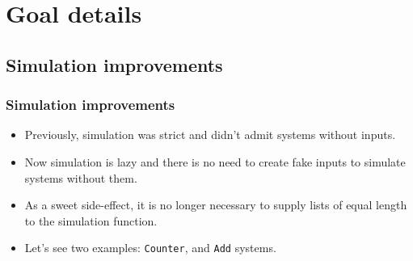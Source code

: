 \documentclass{beamer}
\begin{document}
\section{Goal details}

\subsection{Simulation improvements}

\begin{frame}
  \frametitle{Simulation improvements}
  \begin{itemize}
  \item
  Previously, simulation was strict and didn't admit systems without inputs.
   \pause
  \item
    Now simulation is lazy and there is no need to create fake inputs to
simulate systems without them.
  \item As a sweet side-effect, it is no longer necessary to supply
    lists of equal length to the simulation function.
  \pause
  \item
  Let's see two examples: \texttt{Counter}, and \texttt{Add} systems.
 
\end{itemize}

\end{frame}
\end{document}
